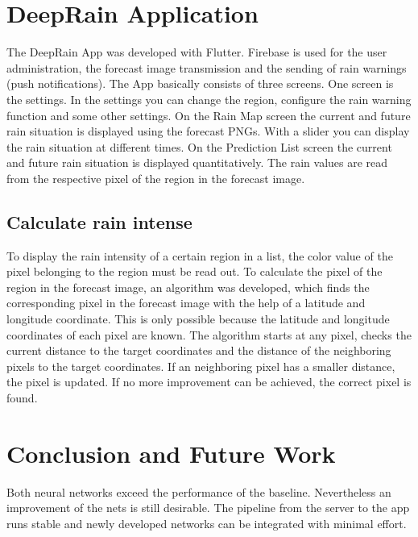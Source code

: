 \documentclass[oneside]{htwg-report}
\begin{document}
\section*{DeepRain Application}
    \begin{sloppypar}
        The DeepRain App was developed with Flutter. 
        Firebase is used for the user administration, the forecast image transmission and the sending of rain warnings (push notifications). 
        The App basically consists of three screens. One screen is the settings. 
        In the settings you can change the region, configure the rain warning function and some other settings.
        On the Rain Map screen the current and future rain situation is displayed using the forecast PNGs. With a slider you can display the rain situation at different times.
        On the Prediction List screen the current and future rain situation is displayed quantitatively. The rain values are read from the respective pixel of the region in the forecast image.   
    \end{sloppypar}
\subsection*{Calculate rain intense}
    \begin{sloppypar}
        To display the rain intensity of a certain region in a list, the color value of the pixel belonging to the region must be read out. 
        To calculate the pixel of the region in the forecast image, an algorithm was developed, which finds the corresponding pixel in the forecast image with the help of a latitude and longitude coordinate. 
        This is only possible because the latitude and longitude coordinates of each pixel are known. 
        The algorithm starts at any pixel, checks the current distance to the target coordinates and the distance of the neighboring pixels to the target coordinates. 
        If an neighboring pixel has a smaller distance, the pixel is updated. If no more improvement can be achieved, the correct pixel is found. 
    \end{sloppypar}


\section*{Conclusion and Future Work}
\begin{sloppypar}
Both neural networks exceed the performance of the baseline. 
Nevertheless an improvement of the nets is still desirable. 
The pipeline from the server to the app runs stable and newly developed networks can be integrated with minimal effort. 
\end{sloppypar}
\end{document}
